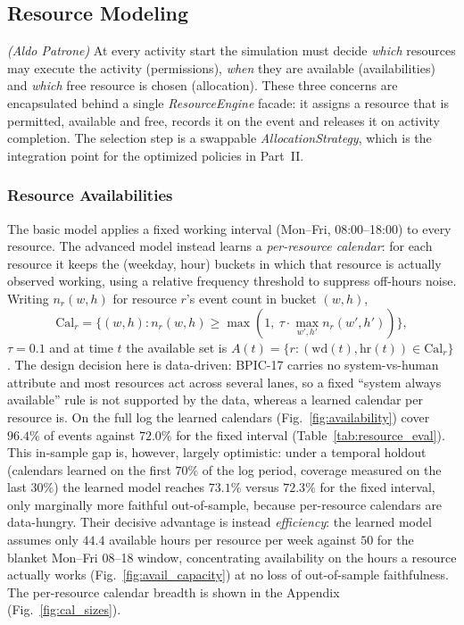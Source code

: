 \subsection{Resource Modeling}\label{subsec:resources}
\textit{(Aldo Patrone)}\quad
At every activity start the simulation must decide \emph{which} resources may
execute the activity (permissions), \emph{when} they are available
(availabilities) and \emph{which} free resource is chosen (allocation). These
three concerns are encapsulated behind a single \emph{ResourceEngine} facade:
it assigns a resource that is permitted, available and free, records it
on the event and releases it on activity completion. The selection step is a
swappable \emph{AllocationStrategy}, which is the integration point for the
optimized policies in Part~II.

\subsubsection{Resource Availabilities}
The basic model applies a fixed working interval (Mon--Fri, 08:00--18:00) to
every resource. The advanced model instead learns a \emph{per-resource calendar}:
for each resource it keeps the (weekday, hour) buckets in which that resource is
actually observed working, using a relative frequency threshold to suppress
off-hours noise. Writing $n_r(w,h)$ for resource $r$'s event count in bucket $(w,h)$,
\[
\mathrm{Cal}_r=\big\{(w,h): n_r(w,h)\ge \max(1,\ \tau\cdot\!\max_{w',h'} n_r(w',h'))\big\},
\]
$\tau=0.1$
and at time $t$ the available set is $A(t)=\{r:(\mathrm{wd}(t),\mathrm{hr}(t))\in\mathrm{Cal}_r\}$.
The design decision here is data-driven: BPIC-17 carries no
system-vs-human attribute and most resources act across several lanes, so a
fixed ``system always available'' rule is not supported by the data, whereas a
learned calendar per resource is. On the full log the learned calendars
(Fig.~\ref{fig:availability}) cover $96.4\%$ of events against $72.0\%$ for the fixed
interval (Table~\ref{tab:resource_eval}). This in-sample gap is, however, largely
optimistic: under a temporal holdout (calendars learned on the first $70\%$ of the log
period, coverage measured on the last $30\%$) the learned model reaches $73.1\%$ versus
$72.3\%$ for the fixed interval, only marginally more faithful out-of-sample, because
per-resource calendars are data-hungry. Their decisive advantage is instead
\emph{efficiency}: the learned model assumes only $44.4$ available hours per resource per
week against $50$ for the blanket Mon--Fri 08--18 window, concentrating availability on the
hours a resource actually works (Fig.~\ref{fig:avail_capacity}) at no loss of out-of-sample
faithfulness. The per-resource calendar breadth is shown in the Appendix
(Fig.~\ref{fig:cal_sizes}).

